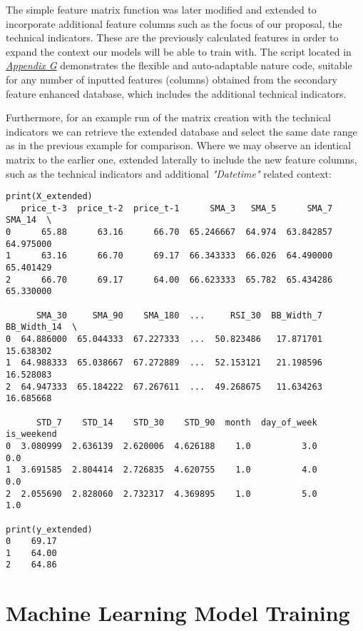 \documentclass[12pt]{report} %
\begin{document}
The simple feature matrix function was later modified and extended to incorporate additional feature columns such as the focus of our proposal, the technical indicators. These are the previously calculated features in order to expand the context our models will be able to train with. The script located in \textit{\hyperref[app:appendix_g_extended_feature_matrix]{Appendix G}} demonstrates the flexible and auto-adaptable nature code, suitable for any number of inputted features (columns) obtained from the secondary feature enhanced database, which includes the additional technical indicators.

Furthermore, for an example run of the matrix creation with the technical indicators we can retrieve the extended database and select the same date range as in the previous example for comparison. Where  we may observe an identical matrix to the earlier one, extended laterally to include the new feature columns, such as the technical indicators and additional \textit{"Datetime"} related context:
\begin{small}
\begin{verbatim}
print(X_extended)
   price_t-3  price_t-2  price_t-1      SMA_3   SMA_5      SMA_7     SMA_14  \
0      65.88      63.16      66.70  65.246667  64.974  63.842857  64.975000   
1      63.16      66.70      69.17  66.343333  66.026  64.490000  65.401429   
2      66.70      69.17      64.00  66.623333  65.782  65.434286  65.330000   

      SMA_30     SMA_90    SMA_180  ...     RSI_30  BB_Width_7  BB_Width_14  \
0  64.886000  65.044333  67.227333  ...  50.823486   17.871701    15.638302   
1  64.988333  65.038667  67.272889  ...  52.153121   21.198596    16.528083   
2  64.947333  65.184222  67.267611  ...  49.268675   11.634263    16.685668   

      STD_7    STD_14    STD_30    STD_90  month  day_of_week  is_weekend  
0  3.080999  2.636139  2.620006  4.626188    1.0          3.0         0.0  
1  3.691585  2.804414  2.726835  4.620755    1.0          4.0         0.0  
2  2.055690  2.828060  2.732317  4.369895    1.0          5.0         1.0

print(y_extended)
0    69.17
1    64.00
2    64.86
\end{verbatim}
\end{small}


\section{Machine Learning Model Training}
\end{document}
